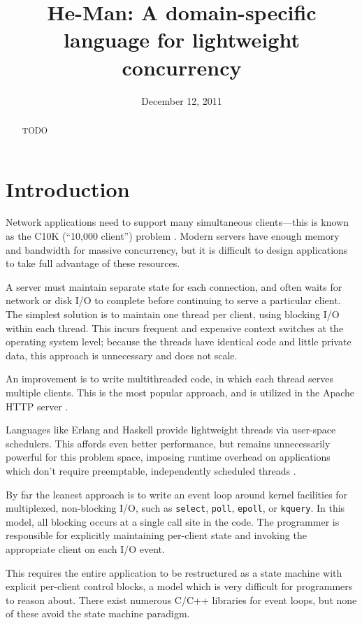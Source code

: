 \documentclass[preprint,11pt]{sigplanconf}
\title{He-Man: A domain-specific language for lightweight concurrency}
\date{December 12, 2011}
\renewcommand{\t}{\texttt}
\begin{document}
\maketitle

\begin{abstract}
TODO
\end{abstract}

\section{Introduction}

Network applications need to support many simultaneous clients---this is known
as the C10K (``10,000 client'') problem \cite{Kegel}. Modern servers have enough
memory and bandwidth for massive concurrency, but it is difficult to design
applications to take full advantage of these resources.

A server must maintain separate state for each connection, and often waits for
network or disk I/O to complete before continuing to serve a particular client.
The simplest solution is to maintain one thread per client, using blocking I/O
within each thread. This incurs frequent and expensive context switches at the
operating system level; because the threads have identical code and little
private data, this approach is unnecessary and does not scale.

An improvement is to write multithreaded code, in which each thread serves
multiple clients. This is the most popular approach, and is utilized in the
Apache HTTP server \cite{Apache}.

Languages like Erlang and Haskell provide lightweight threads via user-space
schedulers. This affords even better performance, but remains unnecessarily
powerful for this problem space, imposing runtime overhead on applications which
don't require preemptable, independently scheduled threads \cite{Vinoski}.

By far the leanest approach is to write an event loop around kernel facilities
for multiplexed, non-blocking I/O, such as \t{select}, \t{poll}, \t{epoll}, or
\t{kquery}. In this model, all blocking occurs at a single call site in the code.
The programmer is responsible for explicitly maintaining per-client state and
invoking the appropriate client on each I/O event.

This requires the entire application to be restructured as a state machine with
explicit per-client control blocks, a model which is very difficult for
programmers to reason about. There exist numerous C/C++ libraries for event
loops, but none of these avoid the state machine paradigm.
\end{document}
